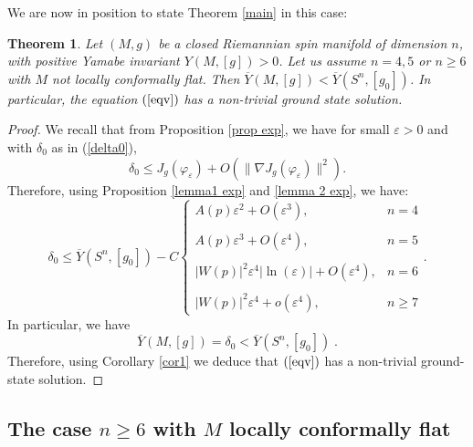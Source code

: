\documentclass[11pt]{article}
\newtheorem{theorem}{Theorem}[section]
\begin{document}
{\noindent
We are now in position to state Theorem \ref{main} in this case:

\begin{theorem}
Let $(M,g)$ be a closed Riemannian spin manifold of dimension $n$, with positive Yamabe invariant $Y(M,[g])>0$. Let us assume $n=4,5$ or $n\geq 6$ with $M$ not locally conformally flat. Then $\overline{Y}(M,[g])<\overline{Y}(S^{n},[g_{0}])$. In particular, the equation $(\ref{eqv})$ has a non-trivial ground state solution.
\end{theorem}
\begin{proof}
We recall that from Proposition \ref{prop exp}, we have for small $\varepsilon>0$ and with $\delta_0$ as in (\ref{delta0}),
$$\delta_{0}\leq J_{g}(\varphi_{\varepsilon})+O(\|\nabla J_{g}(\varphi_{\varepsilon})\|^{2}).$$
Therefore, using Proposition \ref{lemma1 exp} and \ref{lemma 2 exp}, we have:
$$\delta_{0}\leq \overline{Y}(S^{n},[g_{0}])-C\left\{\begin{array}{lll}
A(p)\varepsilon^{2} +O(\varepsilon^{3}), & n=4\\
\\
A(p)\varepsilon^{3}+O(\varepsilon^{4}), & n=5\\
\\
|W(p)|^{2}\varepsilon^{4}|\ln(\varepsilon)|+O(\varepsilon^{4}), & n=6\\
\\
|W(p)|^{2}\varepsilon^{4}+o(\varepsilon^{4}), & n\geq 7
\end{array}
\right. .
$$
In particular, we have
$$\overline{Y}(M,[g])= \delta_{0}<\overline{Y}(S^{n},[g_{0}]) \; .$$
Therefore, using Corollary \ref{cor1} we deduce that $(\ref{eqv})$ has a non-trivial ground-state solution.
\end{proof}




 
\subsection{\texorpdfstring{The case $n\geq 6$ with $M$ locally conformally flat}{The case n greater than 6 with M locally conformally flat}}

}
\end{document}
